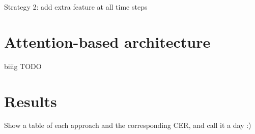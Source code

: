 		Strategy 2: add extra feature at all time steps


\section{Attention-based architecture}\label{sec:attention}
	biiig TODO


\section{Results}\label{sec:transcription_results}

		Show a table of each approach and the corresponding CER, and call it a day :)

\stopToDo{}

